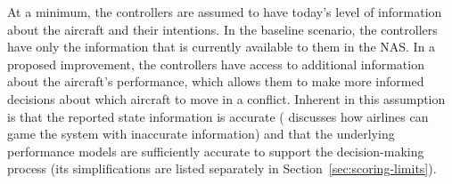 At a minimum, the controllers are assumed to have today's level of information about the aircraft and their intentions. In the baseline scenario, the controllers have only the information that is currently available to them in the NAS. In a proposed improvement, the controllers have access to additional information about the aircraft's performance, which allows them to make more informed decisions about which aircraft to move in a conflict. Inherent in this assumption is that the reported state information is accurate (\cite{kulkarni2019ctopSlotSubstitution} discusses how airlines can game the system with inaccurate information) and that the underlying performance models are sufficiently accurate to support the decision-making process (its simplifications are listed separately in Section~\ref{sec:scoring-limits}).

